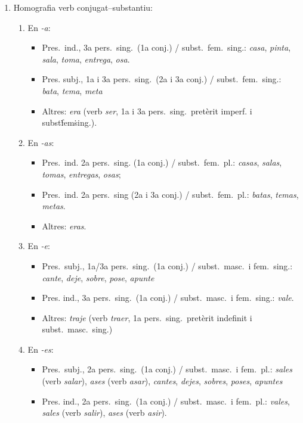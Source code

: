 \begin{enumerate}
\item Homografia verb conjugat--substantiu:
 \begin{enumerate}

   \item En \emph{-a}: 
   \begin{itemize}
   \item Pres.\ ind., 3a pers.\  sing.\ (1a conj.) / subst.\ fem.\ sing.: \emph{casa}, \emph{pinta},
   \emph{ sala}, \emph{toma}, \emph{entrega}, \emph{osa}.
   \item Pres. subj., 1a i 3a pers.\ sing.\ (2a i 3a conj.) / subst.\ fem.\ sing.:
       \emph{bata}, \emph{tema}, \emph{meta}
   \item Altres: \emph{era} (verb \emph{ser}, 1a i 3a pers.\ sing.\
     pretèrit imperf. i subst\. fem\. sing.).
   \end{itemize} 

   \item En \emph{-as}:
   \begin{itemize}
   \item Pres.\ ind. 2a pers.\ sing. (1a conj.) / subst.\ fem.\ pl.:
       \emph{casas}, \emph{salas}, \emph{tomas}, \emph{entregas}, \emph{osas};
   \item Pres.\ ind. 2a pers.\ sing (2a i 3a  conj.) / subst.\ fem.\ pl.:
       \emph{batas}, \emph{temas}, \emph{metas}.
   \item Altres: \emph{eras}.
   \end{itemize}

   \item En \emph{-e}:
   \begin{itemize}
   \item Pres.\ subj., 1a/3a pers.\ sing.\ (1a conj.) / subst.\ masc.\  i fem.\
sing.:
       \emph{cante}, \emph{deje}, \emph{sobre}, \emph{pose}, \emph{apunte}
   \item Pres. ind., 3a pers.\ sing.\ (1a conj.) / subst.\ masc.\  i fem.\
sing.: \emph{vale}.
   \item Altres: \emph{traje} (verb \emph{traer}, 1a pers.\ sing.\
     pretèrit indefinit i subst.\ masc.\ sing.)
   \end{itemize}

   \item En \emph{-es}:
   \begin{itemize}
   \item Pres.\ subj., 2a pers.\ sing.\ (1a conj.) / subst.\ masc.\  i fem.\
pl.: \emph{sales} (verb \emph{salar}), \emph{ases} (verb \emph{asar}), 
     \emph{cantes}, \emph{dejes}, \emph{sobres}, \emph{poses}, \emph{apuntes}
   \item Pres. ind., 2a pers.\ sing.\ (1a conj.) / subst.\ masc.\  i fem.\
pl.: \emph{vales}, \emph{sales} (verb \emph{salir}), \emph{ases} (verb
\emph{asir}).
   \end{itemize}
 


\end{enumerate}
\end{enumerate}
